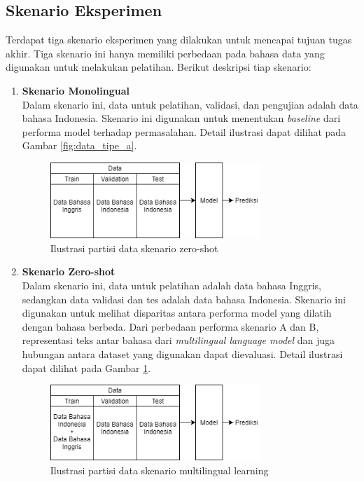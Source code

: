 	\subsection{Skenario Eksperimen}
	Terdapat tiga skenario eksperimen yang dilakukan untuk mencapai tujuan tugas akhir. Tiga skenario ini hanya memiliki perbedaan pada bahasa data yang digunakan untuk melakukan pelatihan. Berikut deskripsi tiap skenario:
	\begin{enumerate}
		\item \textbf{Skenario Monolingual}\\
		Dalam skenario ini, data untuk pelatihan, validasi, dan pengujian adalah data bahasa Indonesia. Skenario ini digunakan untuk menentukan \textit{baseline} dari performa model terhadap permasalahan. Detail ilustrasi dapat dilihat pada Gambar \ref{fig:data_tipe_a}.

		\begin{figure}[t]
		    \centering
		    \includegraphics[width=0.75\textwidth]{resources/Data-tipe-B.png}
		    \caption{Ilustrasi partisi data skenario zero-shot}
		    \label{fig:data_tipe_b}
		\end{figure}

		\item \textbf{Skenario Zero-shot}\\
		Dalam skenario ini, data untuk pelatihan adalah data bahasa Inggris, sedangkan data validasi dan tes adalah data bahasa Indonesia. Skenario ini digunakan untuk melihat disparitas antara performa model yang dilatih dengan bahasa berbeda. Dari perbedaan performa skenario A dan B, representasi teks antar bahasa dari \textit{multilingual language model} dan juga hubungan antara dataset yang digunakan dapat dievaluasi. Detail ilustrasi dapat dilihat pada Gambar \ref{fig:data_tipe_b}.

		

		\begin{figure}[h]
		    \centering
		    \includegraphics[width=0.75\textwidth]{resources/Data-tipe-C.png}
		    \caption{Ilustrasi partisi data skenario multilingual learning}
		    \label{fig:data_tipe_c}
		\end{figure}


\end{enumerate}
